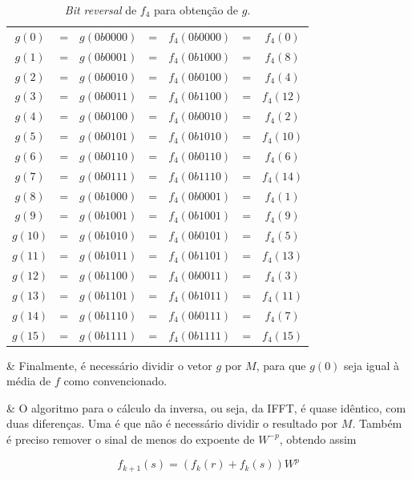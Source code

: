 \begin{table}[!h]
  \centering
  \begin{tabular}{|ccccccc|}
      \hline
      $g(0 )$ & = & $g(0b0000)$ & = & $f_4(0b0000)$ & = & $f_4(0 )$  \\
      $g(1 )$ & = & $g(0b0001)$ & = & $f_4(0b1000)$ & = & $f_4(8 )$  \\
      $g(2 )$ & = & $g(0b0010)$ & = & $f_4(0b0100)$ & = & $f_4(4 )$  \\
      $g(3 )$ & = & $g(0b0011)$ & = & $f_4(0b1100)$ & = & $f_4(12)$  \\
      $g(4 )$ & = & $g(0b0100)$ & = & $f_4(0b0010)$ & = & $f_4(2 )$  \\
      $g(5 )$ & = & $g(0b0101)$ & = & $f_4(0b1010)$ & = & $f_4(10)$  \\
      $g(6 )$ & = & $g(0b0110)$ & = & $f_4(0b0110)$ & = & $f_4(6 )$  \\
      $g(7 )$ & = & $g(0b0111)$ & = & $f_4(0b1110)$ & = & $f_4(14)$  \\
      $g(8 )$ & = & $g(0b1000)$ & = & $f_4(0b0001)$ & = & $f_4(1 )$  \\
      $g(9 )$ & = & $g(0b1001)$ & = & $f_4(0b1001)$ & = & $f_4(9 )$  \\
      $g(10)$ & = & $g(0b1010)$ & = & $f_4(0b0101)$ & = & $f_4(5 )$  \\
      $g(11)$ & = & $g(0b1011)$ & = & $f_4(0b1101)$ & = & $f_4(13)$  \\
      $g(12)$ & = & $g(0b1100)$ & = & $f_4(0b0011)$ & = & $f_4(3 )$  \\
      $g(13)$ & = & $g(0b1101)$ & = & $f_4(0b1011)$ & = & $f_4(11)$  \\
      $g(14)$ & = & $g(0b1110)$ & = & $f_4(0b0111)$ & = & $f_4(7 )$  \\
      $g(15)$ & = & $g(0b1111)$ & = & $f_4(0b1111)$ & = & $f_4(15)$  \\
      \hline
  \end{tabular}
  \caption{\label{tab:bitrev}\textit{Bit reversal} de $f_4$ para obtenção de $g$.}
\end{table}

\begin{easylist}

  & Finalmente, é necessário dividir o vetor $g$ por $M$, para que $g(0)$ seja igual à média de $f$ como convencionado.

  & O algoritmo para o cálculo da inversa, ou seja, da IFFT, é quase idêntico, com duas diferenças. Uma é que não é necessário dividir o resultado por $M$. Também é preciso remover o sinal de menos do expoente de $W^{-p}$, obtendo assim

  \[ f_{k+1}(s) = (f_k(r) + f_k(s)) W^{p} \]


\end{easylist}

  
